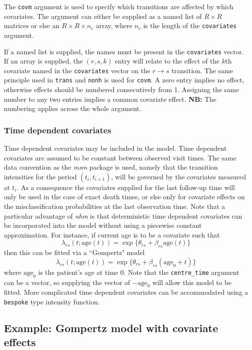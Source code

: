 \documentclass{article}
\numberwithin{equation}{section}
\begin{document}
The \verb!covm! argument is used to specify which transitions are affected by which covariates. The argument can either be supplied as a named list of $R \times R$ matrices or else an $R \times R \times n_c$ array, where $n_c$ is the length of the \verb!covariates! argument.

If a named list is supplied, the names must be present in the \verb!covariates! vector. If an array is supplied, the $(r,s, k)$ entry will relate to the effect of the $k$th covariate named in the \verb!covariates! vector on the $r \rightarrow s$ transition. The same principle used in \verb!trans! and \verb!nonh! is used for \verb!covm!. A zero entry implies no effect, otherwise effects should be numbered consecutively from 1. Assigning the same number to any two entries implies a common covariate effect. {\bf NB:} The numbering applies across the whole argument.

\subsubsection{Time dependent covariates}

Time dependent covariates may be included in the model. Time dependent covariates are assumed to be constant between observed visit times. The same data convention as the {\it msm} package is used, namely that  the transition intensities for the period $(t_i, t_{i+1})$, will be governed by the covariates measured at $t_i$. As a consequence the covariates supplied for the last follow-up time will only be used in the case of exact death times, or else only for covariate effects on the misclassification probabilities at the last observation time. Note that a particular advantage of {\it nhm} is that deterministic time dependent covariates can be incorporated into the model without using a piecewise constant approximation. For instance, if current age is to be a covariate such that
$$\lambda_{rs}(t ; \mbox{age}(t)) = \exp\{\theta_{rs} + \beta_{rs} \mbox{age}(t)\}$$
then this can be fitted via a ``Gompertz" model
$$\lambda_{rs}(t ; \mbox{age}(t)) = \exp\{\theta_{rs} + \beta_{rs} (\mbox{age}_0 + t)\}$$
where $\mbox{age}_0$ is the patient's age at time 0.
Note that the \verb!centre_time! argument can be a vector, so supplying the vector of $-\mbox{age}_0$ will allow this model to be fitted. More complicated time dependent covariates can be accommodated using a \verb!bespoke! type intensity function.

\subsection{Example: Gompertz model with covariate effects}
\label{sec:gomp_model1}
\end{document}

